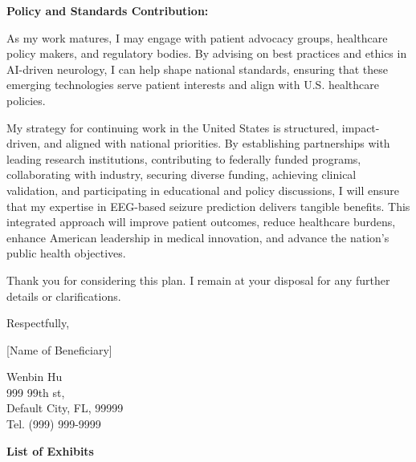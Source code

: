 \documentclass{article}
\begin{document}
{\bf Policy and Standards Contribution: }

As my work matures, I may engage with patient advocacy groups, healthcare policy makers, and regulatory bodies. By advising on best practices and ethics in AI-driven neurology, I can help shape national standards, ensuring that these emerging technologies serve patient interests and align with U.S. healthcare policies.

My strategy for continuing work in the United States is structured, impact-driven, and aligned with national priorities. By establishing partnerships with leading research institutions, contributing to federally funded programs, collaborating with industry, securing diverse funding, achieving clinical validation, and participating in educational and policy discussions, I will ensure that my expertise in EEG-based seizure prediction delivers tangible benefits. This integrated approach will improve patient outcomes, reduce healthcare burdens, enhance American leadership in medical innovation, and advance the nation’s public health objectives.

Thank you for considering this plan. I remain at your disposal for any further details or clarifications.

Respectfully,

[Name of Beneficiary]

\vspace{5\baselineskip}

Wenbin Hu\\
999 99th st,\\
Default City, FL, 99999\\
Tel. (999) 999-9999


\clearpage

{\bf List of Exhibits}
\label{exhib}
\end{document}
